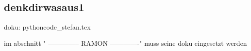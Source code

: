 \subsection{denkdirwasaus1}
 \label{subsec:denkdirwasaus1}

doku: pythoncode_stefan.tex

im abschnitt  " -------------- RAMON -------------" muss seine doku eingesetzt werden


